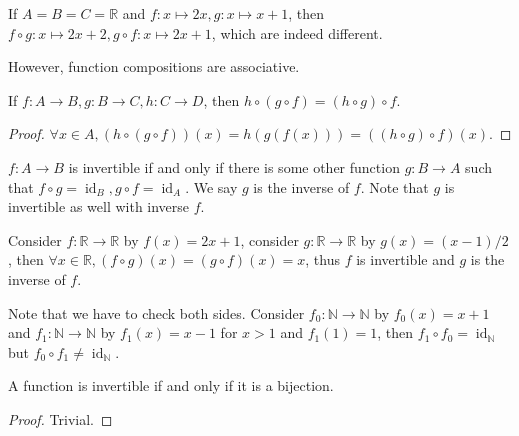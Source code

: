 \begin{example}
    If $A=B=C=\mathbb R$ and $f: x\mapsto 2x,g: x\mapsto x+1$, then $f\circ g: x\mapsto 2x+2,g\circ f:x\mapsto 2x+1$, which are indeed different.
\end{example}
However, function compositions are associative.
\begin{proposition}
    If $f:A\to B,g:B\to C,h:C\to D$, then $h\circ (g\circ f)=(h\circ g)\circ f$.
\end{proposition}
\begin{proof}
    $\forall x\in A, (h\circ (g\circ f))(x)=h(g(f(x)))=((h\circ g)\circ f)(x)$.
\end{proof}
\begin{definition}
    $f:A\to B$ is invertible if and only if there is some other function $g:B\to A$ such that $f\circ g=\operatorname{id}_B,g\circ f=\operatorname{id}_{A}$.
    We say $g$ is the inverse of $f$.
    Note that $g$ is invertible as well with inverse $f$.
\end{definition}
\begin{example}
    Consider $f:\mathbb R\to\mathbb R$ by $f(x)=2x+1$, consider $g:\mathbb R\to\mathbb R$ by $g(x)=(x-1)/2$, then $\forall x\in\mathbb R,(f\circ g)(x)=(g\circ f)(x)=x$, thus $f$ is invertible and $g$ is the inverse of $f$.
\end{example}
\begin{remark}
    Note that we have to check both sides.
    Consider $f_0:\mathbb N\to\mathbb N$ by $f_0(x)=x+1$ and $f_1:\mathbb N\to\mathbb N$ by $f_1(x)=x-1$ for $x>1$ and $f_1(1)=1$, then $f_1\circ f_0=\operatorname{id}_{\mathbb N}$ but $f_0\circ f_1\neq\operatorname{id}_{\mathbb N}$.
\end{remark}
\begin{proposition}
    A function is invertible if and only if it is a bijection.
\end{proposition}
\begin{proof}
    Trivial.
\end{proof}
